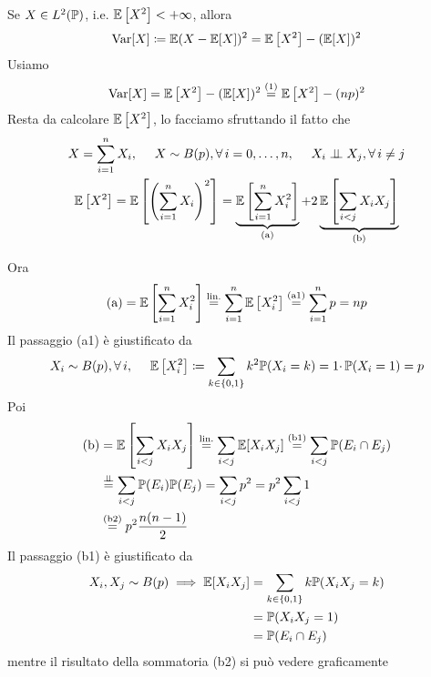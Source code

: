 \begin{enumerate}
Se $X\in L^{2}(\mathbb{P})$, i.e. $\mathbb{E}\left[X^{2}\right] < +\infty $, allora
\begin{equation*}
\operatorname{Var}[ X] \coloneqq \mathbb{E}(X-\mathbb{E}[ X])^{2} =\mathbb{E}\left[ X^{2}\right] -(\mathbb{E}[ X])^{2}
\end{equation*}
Usiamo
\begin{equation*}
\operatorname{Var}[ X] =\mathbb{E}\left[ X^{2}\right] -(\mathbb{E}[ X])^{2}\overset{(1)}{=}\mathbb{E}\left[ X^{2}\right] -(np)^{2}
\end{equation*}
Resta da calcolare $\mathbb{E}\left[X^{2}\right]$, lo facciamo sfruttando il fatto che
\begin{gather*}
X=\sum\limits _{i=1}^{n} X_{i} ,\ \ \ \ X\sim B(p) ,\forall i=0,\dots ,n,\ \ \ \ X_{i} \indep X_{j} ,\forall i\neq j\\
\EE\left[ X^{2}\right] =\EE\left[\left(\sum\limits _{i=1}^{n} X_{i}\right)^{2}\right] =\underbrace{\EE\left[\sum\limits _{i=1}^{n} X_{i}^{2}\right]}_{\text{(a)}} +2\underbrace{\EE\left[\sum\limits _{i< j} X_{i} X_{j}\right]}_{\text{(b)}}
\end{gather*}

Ora
\begin{equation*}
\text{(a)} =\mathbb{E}\left[\sum\limits_{i=1}^{n} X_{i}^{2}\right]\overset{\text{lin.}}{=}\sum\limits_{i=1}^{n}\mathbb{E}\left[X_{i}^{2}\right]\overset{\text{(a1)}}{=}\sum\limits_{i=1}^{n} p=np
\end{equation*}
Il passaggio (a1) è giustificato da
\begin{equation*}
X_{i} \sim B(p) ,\forall i,\ \ \ \ \EE\left[X_{i}^{2}\right] \coloneqq \sum\limits_{k\in \{0,1\}} k^{2}\PP(X_{i} =k) =1\cdotp \PP(X_{i} =1) =p
\end{equation*}
Poi
\begin{align*}
\text{(b)} & =\mathbb{E}\left[\sum\limits _{i< j} X_{i} X_{j}\right]\overset{\text{lin.}}{=}\sum\limits _{i< j} \mathbb{E}[ X_{i} X_{j}]\overset{\text{(b1)}}{=}\sum\limits _{i< j}\mathbb{P}(E_{i} \cap E_{j})\\
 & \overset{\perp \!\!\! \perp }{=}\sum\limits _{i< j}\mathbb{P}(E_{i})\mathbb{P}(E_{j}) =\sum\limits _{i< j} p^{2} =p^{2}\sum\limits _{i< j} 1\\
 & \overset{\text{(b2)}}{=} p^{2}\frac{n(n-1)}{2}
\end{align*}
Il passaggio (b1) è giustificato da
\begin{align*}
X_{i} ,X_{j} \sim B(p) \implies \mathbb{E}[X_{i} X_{j}] & =\sum\limits_{k\in \{0,1\}} k\mathbb{P}(X_{i} X_{j} =k)\\
 & =\mathbb{P}(X_{i} X_{j} =1)\\
 & =\mathbb{P}(E_{i} \cap E_{j})
\end{align*}
mentre il risultato della sommatoria (b2) si può vedere graficamente


\end{enumerate}
